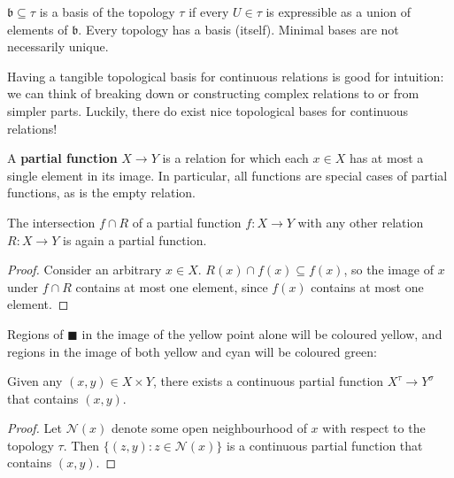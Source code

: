 \begin{rem}
$\mathfrak{b} \subseteq \tau$ is a basis of the topology $\tau$ if every $U \in \tau$ is expressible as a union of elements of $\mathfrak{b}$. Every topology has a basis (itself). Minimal bases are not necessarily unique.
\end{rem}

Having a tangible topological basis for continuous relations is good for intuition: we can think of breaking down or constructing complex relations to or from simpler parts. Luckily, there do exist nice topological bases for continuous relations!

\begin{defn}
A \textbf{partial function} $X \rightarrow Y$ is a relation for which each $x \in X$ has at most a single element in its image. In particular, all functions are special cases of partial functions, as is the empty relation.
\end{defn}

\begin{lemma}\label{lem:capideal}
The intersection $f \cap R$ of a partial function $f: X \rightarrow Y$ with any other relation $R: X \rightarrow Y$ is again a partial function.
\begin{proof}
Consider an arbitrary $x \in X$. $R(x) \cap f(x) \subseteq f(x)$, so the image of $x$ under $f \cap R$ contains at most one element, since $f(x)$ contains at most one element.
\end{proof}
\end{lemma}

\begin{marginfigure}
\centering
{}
\caption{Regions of $\blacksquare$ in the image of the yellow point alone will be coloured yellow, and regions in the image of both yellow and cyan will be coloured green:}
\label{fig:yellowgreen}
\end{marginfigure}

\begin{lemma}\label{lem:edgecomplete}
Given any $(x,y) \in X \times Y$, there exists a continuous partial function $X^\tau \rightarrow Y^\sigma$ that contains $(x,y)$.
\begin{proof}
Let $\mathcal{N}(x)$ denote some open neighbourhood of $x$ with respect to the topology $\tau$. Then $\{ (z,y) : z \in \mathcal{N}(x) \}$ is a continuous partial function that contains $(x,y)$.
\end{proof}
\end{lemma}

